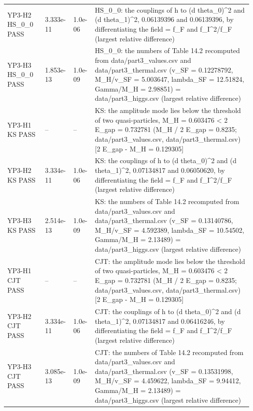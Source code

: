 \documentclass[aps,prd,onecolumn,superscriptaddress,nofootinbib,floatfix,longbibliography]{revtex4-2}
\begin{document}
\begin{longtable}{p{}p{}p{}p{}}
YP3-H2 HS\_0\_0 \newline PASS & 3.333e-11 & 1.0e-06 & HS\_0\_0: the couplings of h to (d theta\_0)\textasciicircum{}2 and (d theta\_1)\textasciicircum{}2, 0.06139396 and 0.06139396, by differentiating the field = f\_F and f\_I\textasciicircum{}2/f\_F (largest relative difference) \\
YP3-H3 HS\_0\_0 \newline PASS & 1.853e-13 & 1.0e-09 & HS\_0\_0: the numbers of Table 14.2 recomputed from data/part3\_values.csv and data/part3\_thermal.csv (v\_SF = 0.12278792, M\_H/v\_SF = 5.003647, lambda\_SF = 12.51824, Gamma/M\_H = 2.98851) = data/part3\_higgs.csv (largest relative difference) \\
YP3-H1 KS \newline PASS & -- & -- & KS: the amplitude mode lies below the threshold of two quasi-particles, M\_H = 0.603476 \textless{} 2 E\_gap = 0.732781 (M\_H / 2 E\_gap = 0.8235; data/part3\_values.csv, data/part3\_thermal.csv) [2 E\_gap - M\_H = 0.129305] \\
YP3-H2 KS \newline PASS & 3.334e-11 & 1.0e-06 & KS: the couplings of h to (d theta\_0)\textasciicircum{}2 and (d theta\_1)\textasciicircum{}2, 0.07134817 and 0.06050620, by differentiating the field = f\_F and f\_I\textasciicircum{}2/f\_F (largest relative difference) \\
YP3-H3 KS \newline PASS & 2.514e-13 & 1.0e-09 & KS: the numbers of Table 14.2 recomputed from data/part3\_values.csv and data/part3\_thermal.csv (v\_SF = 0.13140786, M\_H/v\_SF = 4.592389, lambda\_SF = 10.54502, Gamma/M\_H = 2.13489) = data/part3\_higgs.csv (largest relative difference) \\
YP3-H1 CJT \newline PASS & -- & -- & CJT: the amplitude mode lies below the threshold of two quasi-particles, M\_H = 0.603476 \textless{} 2 E\_gap = 0.732781 (M\_H / 2 E\_gap = 0.8235; data/part3\_values.csv, data/part3\_thermal.csv) [2 E\_gap - M\_H = 0.129305] \\
YP3-H2 CJT \newline PASS & 3.334e-11 & 1.0e-06 & CJT: the couplings of h to (d theta\_0)\textasciicircum{}2 and (d theta\_1)\textasciicircum{}2, 0.07134817 and 0.06416246, by differentiating the field = f\_F and f\_I\textasciicircum{}2/f\_F (largest relative difference) \\
YP3-H3 CJT \newline PASS & 3.085e-13 & 1.0e-09 & CJT: the numbers of Table 14.2 recomputed from data/part3\_values.csv and data/part3\_thermal.csv (v\_SF = 0.13531998, M\_H/v\_SF = 4.459622, lambda\_SF = 9.94412, Gamma/M\_H = 2.13489) = data/part3\_higgs.csv (largest relative difference) \\
\end{longtable}
\endgroup
\end{document}

